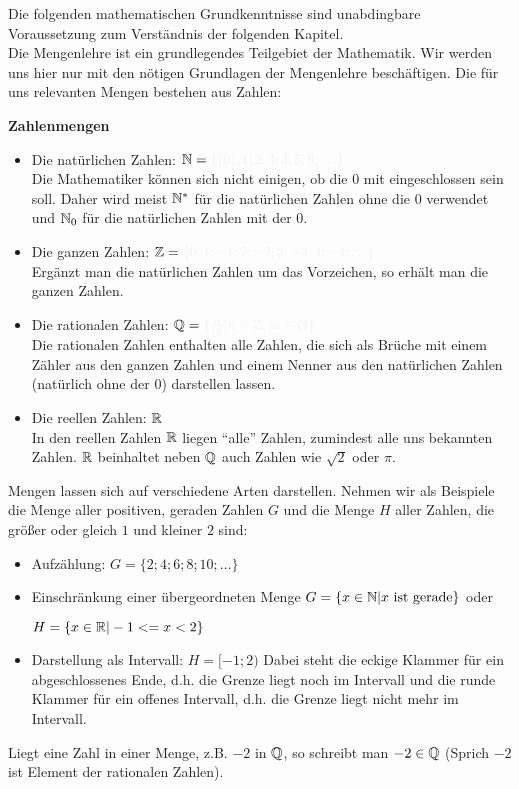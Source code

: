 Die folgenden mathematischen Grundkenntnisse sind unabdingbare Voraussetzung zum Verständnis der folgenden Kapitel.\\
Die Mengenlehre ist ein grundlegendes Teilgebiet der Mathematik. Wir werden uns hier nur mit den nötigen Grundlagen der Mengenlehre beschäftigen. Die für uns relevanten Mengen bestehen aus Zahlen:
\begin{tcolorbox}
	\textbf{Zahlenmengen}
	\begin{itemize}
		\item Die natürlichen Zahlen: \({\N=\textcolor{loestc}{\{(0), 1; 2; 3; 4; 5; 6; \ldots\}}}\)\\Die Mathematiker können sich nicht einigen, ob die 0 mit eingeschlossen sein soll. Daher wird meist $\mathbb{N}^*$ für die natürlichen Zahlen ohne die 0 verwendet und \(\mathbb{N}_0\) für die natürlichen Zahlen mit der 0.
		\item Die ganzen Zahlen: \({\Z=\textcolor{loestc}{\{0; 1; -1; 2; -2; 3; -3; 4; -4;\ldots\}}}\)\\Ergänzt man die natürlichen Zahlen um das Vorzeichen, so erhält man die ganzen Zahlen.
		\item Die rationalen Zahlen: \({\Q=\textcolor{loestc}{\{\frac{n}{m}|n\in\Z, m\in\N\}}}\)\\Die rationalen Zahlen enthalten alle Zahlen, die sich als Brüche mit einem Zähler aus den ganzen Zahlen und einem Nenner aus den natürlichen Zahlen (natürlich ohne der 0) darstellen lassen.
		\item Die reellen Zahlen: \(\mathbb{R}\)\\In den reellen Zahlen \(\mathbb{R}\) liegen "`alle"' Zahlen, zumindest alle uns bekannten Zahlen. \(\mathbb{R}\) beinhaltet neben \(\mathbb{Q}\) auch Zahlen wie \(\sqrt{2}\) oder \(\pi\).
	\end{itemize}
\end{tcolorbox}
Mengen lassen sich auf verschiedene Arten darstellen. Nehmen wir als Beispiele die Menge aller positiven, geraden Zahlen $G$ und die Menge $H$ aller Zahlen, die größer oder gleich $1$ und kleiner $2$ sind:
\begin{itemize}
	\item Aufzählung: ${G=\{2; 4; 6; 8; 10;\ldots \}}$
	\item Einschränkung einer übergeordneten Menge ${G=\{x\in\mathbb{N}|x\text{ ist gerade}\}}$ oder
	
	${H=\{x\in\mathbb{R}|-1<=x<2\}}$
	\item Darstellung als Intervall: $H=[-1;2)$ Dabei steht die eckige Klammer für ein abgeschlossenes Ende, d.h. die Grenze liegt noch im Intervall und die runde Klammer für ein offenes Intervall, d.h. die Grenze liegt nicht mehr im Intervall.
\end{itemize}
Liegt eine Zahl in einer Menge, z.B. $-2$ in $\mathbb{Q}$, so schreibt man ${-2\in\mathbb{Q}}$ (Sprich $-2$ ist Element der rationalen Zahlen).